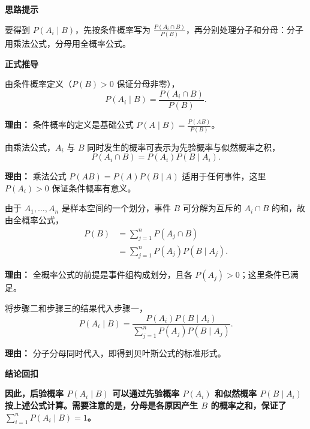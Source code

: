 \begin{proofbox}
	\textbf{\textcolor{CProof}{思路提示}}

	要得到 $P(A_i\mid B)$，先按条件概率写为 $\frac{P(A_i\cap B)}{P(B)}$，再分别处理分子和分母：分子用乘法公式，分母用全概率公式。

	\medskip
	\textbf{\textcolor{CProof}{正式推导}}
	\begin{description}[style=nextline, leftmargin=2.8em, labelsep=0.5em, itemsep=0.55em]
		\item[\textbf{步骤一（条件概率）：}] 由条件概率定义（$P(B)>0$ 保证分母非零），
			\[
				P(A_i\mid B) = \frac{P(A_i\cap B)}{P(B)}.
			\]
			\par\textbf{理由：} 条件概率的定义是基础公式 $P(A\mid B)=\frac{P(AB)}{P(B)}$。

		\item[\textbf{步骤二（分子转化）：}] 由乘法公式，$A_i$ 与 $B$ 同时发生的概率可表示为先验概率与似然概率之积，
			\[
				P(A_i\cap B) = P(A_i)P(B\mid A_i).
			\]
			\par\textbf{理由：} 乘法公式 $P(AB)=P(A)P(B\mid A)$ 适用于任何事件，这里 $P(A_i)>0$ 保证条件概率有意义。

		\item[\textbf{步骤三（分母全概率）：}] 由于 $A_1,\dots,A_n$ 是样本空间的一个划分，事件 $B$ 可分解为互斥的 $A_i\cap B$ 的和，故由全概率公式，
			\[
				\begin{aligned}
					P(B) &= \sum_{j=1}^{n} P(A_j\cap B) \\
					&= \sum_{j=1}^{n} P(A_j)P(B\mid A_j).
			\end{aligned}
			\]
			\par\textbf{理由：} 全概率公式的前提是事件组构成划分，且各 $P(A_j)>0$；这里条件已满足。

		\item[\textbf{步骤四（代入合并）：}] 将步骤二和步骤三的结果代入步骤一，
			\[
				P(A_i\mid B) = \frac{P(A_i)P(B\mid A_i)}{\displaystyle\sum_{j=1}^{n} P(A_j)P(B\mid A_j)}.
			\]
			\par\textbf{理由：} 分子分母同时代入，即得到贝叶斯公式的标准形式。
	\end{description}

	\medskip
	\textbf{\textcolor{CProof}{结论回扣}}

	\textbf{因此，后验概率 $P(A_i\mid B)$ 可以通过先验概率 $P(A_i)$ 和似然概率 $P(B\mid A_i)$ 按上述公式计算。需要注意的是，分母是各原因产生 $B$ 的概率之和，保证了 $\sum_{i=1}^{n}P(A_i\mid B)=1$。}
\end{proofbox}
